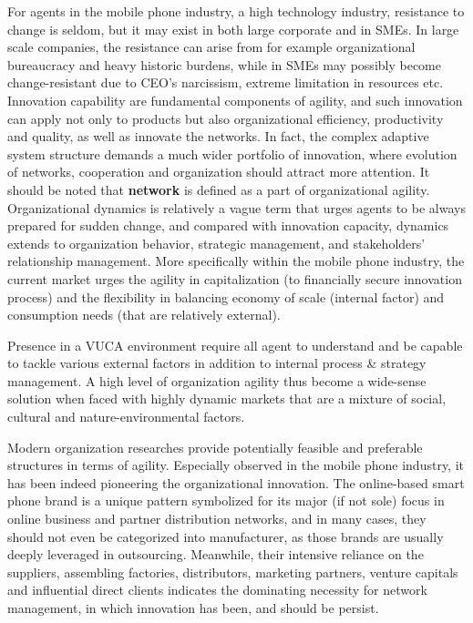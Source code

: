 \documentclass[utf8,english]{gradu3}
\begin{document}
For agents in the mobile phone industry, a high technology industry, resistance to change is seldom, but it may exist in both large corporate and in SMEs. In large scale companies, the resistance can arise from for example organizational bureaucracy and heavy historic burdens, while in SMEs may possibly become change-resistant due to CEO's narcissism, extreme limitation in resources etc. Innovation capability are fundamental components of agility, and such innovation can apply not only to products but also organizational efficiency, productivity and quality, as well as innovate the networks. In fact, the complex adaptive system structure demands a much wider portfolio of innovation, where evolution of networks, cooperation and organization should attract more attention. It should be noted that \textbf{network} is defined as a part of organizational agility. Organizational dynamics is relatively a vague term that urges agents to be always prepared for sudden change, and compared with innovation capacity, dynamics extends to organization behavior, strategic management, and stakeholders’ relationship management. More specifically within the mobile phone industry, the current market urges the agility in capitalization (to financially secure innovation process) and the flexibility in balancing economy of scale (internal factor) and consumption needs (that are relatively external).

Presence in a VUCA environment require all agent to understand and be capable to tackle various external factors in addition to internal process \& strategy management. A high level of organization agility thus become a wide-sense solution when faced with highly dynamic markets that are a mixture of social, cultural and nature-environmental factors.

Modern organization researches provide potentially feasible and preferable structures in terms of agility. Especially observed in the mobile phone industry, it has been indeed pioneering the organizational innovation. The online-based smart phone brand is a unique pattern symbolized for its major (if not sole) focus in online business and partner distribution networks, and in many cases, they should not even be categorized into manufacturer, as those brands are usually deeply leveraged in outsourcing. Meanwhile, their intensive reliance on the suppliers, assembling factories, distributors, marketing partners, venture capitals and influential direct clients indicates the dominating necessity for network management, in which innovation has been, and should be persist.
\end{document}
